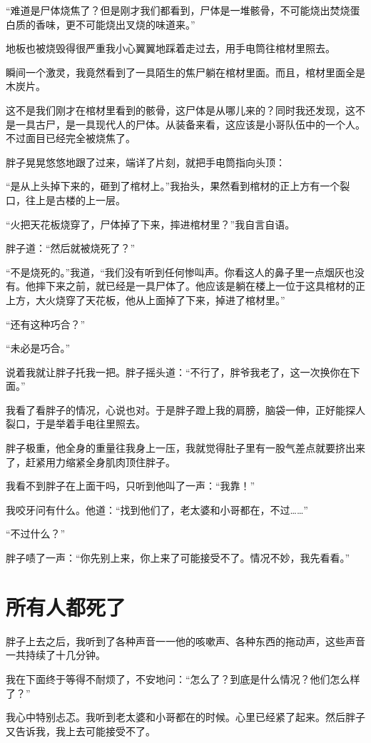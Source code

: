 “难道是尸体烧焦了？但是刚才我们都看到，尸体是一堆骸骨，不可能烧出焚烧蛋白质的香味，更不可能烧出叉烧的味道来。”

地板也被烧毁得很严重我小心翼翼地踩着走过去，用手电筒往棺材里照去。

瞬间一个激灵，我竟然看到了一具陌生的焦尸躺在棺材里面。而且，棺材里面全是木炭片。

这不是我们刚才在棺材里看到的骸骨，这尸体是从哪儿来的？同时我还发现，这不是一具古尸，是一具现代人的尸体。从装备来看，这应该是小哥队伍中的一个人。不过面目已经完全被烧焦了。

胖子晃晃悠悠地跟了过来，端详了片刻，就把手电筒指向头顶：

“是从上头掉下来的，砸到了棺材上。”我抬头，果然看到棺材的正上方有一个裂口，往上是古楼的上一层。

“火把天花板烧穿了，尸体掉了下来，摔进棺材里？”我自言自语。

胖子道：“然后就被烧死了？”

“不是烧死的。”我道，“我们没有听到任何惨叫声。你看这人的鼻子里一点烟灰也没有。他摔下来之前，就已经是一具尸体了。他应该是躺在楼上一位于这具棺材的正上方，大火烧穿了天花板，他从上面掉了下来，掉进了棺材里。”

“还有这种巧合？”

“未必是巧合。”

说着我就让胖子托我一把。胖子摇头道：“不行了，胖爷我老了，这一次换你在下面。”

我看了看胖子的情况，心说也对。于是胖子蹬上我的肩膀，脑袋一伸，正好能探人裂口，于是举着手电往里照去。

胖子极重，他全身的重量往我身上一压，我就觉得肚子里有一股气差点就要挤出来了，赶紧用力缩紧全身肌肉顶住胖子。

我看不到胖子在上面干吗，只听到他叫了一声：“我靠！”

我咬牙问有什么。他道：“找到他们了，老太婆和小哥都在，不过……”

“不过什么？”

胖子啧了一声：“你先别上来，你上来了可能接受不了。情况不妙，我先看看。”

\chapter{所有人都死了}

胖子上去之后，我听到了各种声音一一他的咳嗽声、各种东西的拖动声，这些声音一共持续了十几分钟。

我在下面终于等得不耐烦了，不安地问：“怎么了？到底是什么情况？他们怎么样了？”

我心中特别忐忑。我听到老太婆和小哥都在的时候。心里已经紧了起来。然后胖子又告诉我，我上去可能接受不了。

